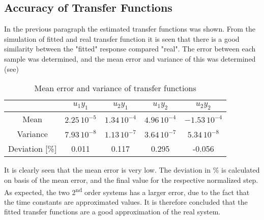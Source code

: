 \subsection{Accuracy of Transfer Functions}
In the previous paragraph the estimated transfer functions was shown. From the simulation of fitted and real transfer function it is seen that there is a good similarity between the "fitted" response compared "real". The error between each sample was determined, and the mean error and variance of this was determined (see)
\begin{table}[H]
    \centering
    \begin{tabular}{|c|c|c|c|c|} \hline
         & $u_1y_1$ & $u_2y_1$ & $u_1y_2$ & $u_2y_2$\\\hline
        Mean & $2.25\,10^{-5}$ & $1.34\,10^{-4}$ & $4.96\,10^{-4}$ & $-1.53\,10^{-4}$\\
        Variance & $7.93\,10^{-8}$ & $1.13\,10^{-7}$ & $3.64\,10^{-7}$ & $5.34\,10^{-8}$\\ 
        Deviation [\%] & 0.011 & 0.117 & 0.295 & -0.056\\ \hline
    \end{tabular}
    \caption{Mean error and variance of transfer functions}
    \label{tab:precission_TF}
\end{table}
It is clearly seen that the mean error is very low. The deviation in \% is calculated on basis of the mean error, and the final value for the respective normalized step. As expected, the two 2\textsuperscript{nd} order systems has a larger error, due to the fact that the time constants are approximated values. It is therefore concluded that the fitted transfer functions are a good approximation of the real system.